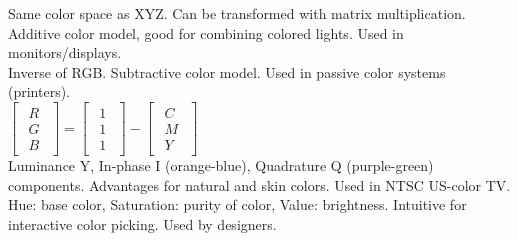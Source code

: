  Same color space as XYZ. Can be transformed with matrix multiplication. Additive color model, good for combining colored lights. Used in monitors/displays. \\
 Inverse of RGB. Subtractive color model. Used in passive color systems (printers). \\
$\begin{bmatrix}
    \begin{smallmatrix}
        R \\ G \\ B
    \end{smallmatrix}
\end{bmatrix} = 
\begin{bmatrix}
    \begin{smallmatrix}
        1 \\ 1 \\ 1
    \end{smallmatrix}
\end{bmatrix} - 
\begin{bmatrix}
    \begin{smallmatrix}
        C \\ M \\ Y
    \end{smallmatrix}
\end{bmatrix}$ \\
 Luminance Y, In-phase I (orange-blue), Quadrature Q (purple-green) components. Advantages for natural and skin colors. Used in NTSC US-color TV. \\
 Hue: base color, Saturation: purity of color, Value: brightness. Intuitive for interactive color picking. Used by designers.